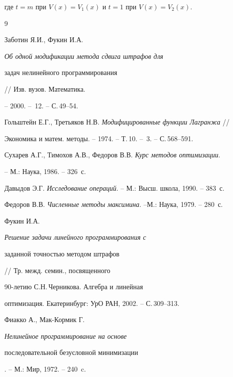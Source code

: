 где $t=m$ при $V(x)=V_1(x)$ и $t=1$ при $V(x)=V_2(x)$.








\begin{thebibliography}{9}







Заботин Я.И., Фукин И.А. {\it Об одной модификации метода сдвига штрафов для


задач нелинейного программирования} // Изв. вузов. Математика.


-- 2000. -- \No\,12. -- С.\,49--54.




Гольштейн Е.Г., Третьяков Н.В. {\it Модифицированные функции Лагранжа} //


Экономика и матем. методы. -- 1974. -- Т.\,10. -- \No\,3. -- С.\,568--591.




Сухарев А.Г., Тимохов А.В., Федоров В.В. {\it Курс методов оптимизации}.


-- М.: Наука, 1986. -- 326~с.




Давыдов Э.Г. {\it Исследование операций}. -- М.: Высш. школа, 1990. -- 383~с.




Федоров В.В. {\it Численные методы максимина}. --М.: Наука, 1979. -- 280~с.




Фукин И.А. {\it Решение задачи линейного программирования с 


заданной точностью методом штрафов} // Тр. межд. семин., посвященного


90-летию С.Н.\,Черникова. Алгебра и линейная 


оптимизация. Екатеринбург: УрО РАН, 2002. -- С.\,309--313.




Фиакко А., Мак-Кормик Г. {\it Нелинейное программирование на основе


последовательной безусловной минимизации}. -- М.: Мир, 1972. -- 240~c.





\end{thebibliography}





\vskip 2cm












\label{end}





